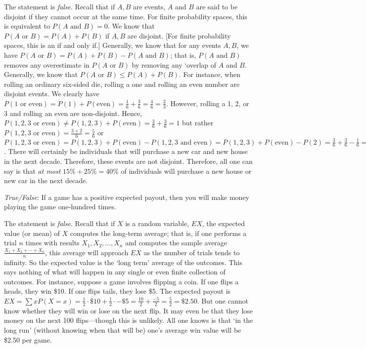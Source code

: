 \documentclass[11pt,letterpaper]{article}
\begin{document}
\sol The statement is \textit{false}. Recall that if $A, B$ are events, $A$ and $B$ are said to be disjoint if they cannot occur at the same time. For finite probability spaces, this is equivalent to $P(A \text{ and } B)= 0$. We know that $P(A \text{ or } B)= P(A) + P(B)$ if $A, B$ are disjoint. [For finite probability spaces, this is an if and only if.] Generally, we know that for any events $A, B$, we have $P(A \text{ or } B)= P(A) + P(B) - P(A \text{ and } B)$; that is, $P(A \text{ and } B)$ removes any overestimate in $P(A \text{ or } B)$ by removing any `overlap of $A$ and $B$. Generally, we know that $P(A \text{ or } B) \leq P(A) + P(B)$. For instance, when rolling an ordinary six-sided die, rolling a one and rolling an even number are disjoint events. We clearly have $P(1 \text{ or even})= P(1) + P(\text{even})= \frac{1}{6} + \frac{3}{6}= \frac{4}{6}= \frac{2}{3}$. However, rolling a 1, 2, or 3 and rolling an even are non-disjoint. Hence, $P(1, 2, 3 \text{ or even}) \neq P(1, 2, 3) + P(\text{even})= \frac{3}{6} + \frac{3}{6}= 1$ but rather $P(1, 2, 3 \text{ or even})= \frac{3 + 2}{6}= \frac{5}{6}$ or $P(1, 2, 3 \text{ or even})= P(1, 2, 3) + P(\text{even}) - P(1, 2, 3 \text{ and even})= P(1, 2, 3) + P(\text{even}) - P(2)= \frac{3}{6} + \frac{3}{6} - \frac{1}{6}= \frac{5}{6}$. There will certainly be individuals that will purchase a new car and new house in the next decade. Therefore, these events are not disjoint. Therefore, all one can say is that \textit{at most} $15\% + 25\%= 40\%$ of individuals will purchase a new house or new car in the next decade. \pvspace{1.3cm}



\quizsol \textit{True/False}: If a game has a positive expected payout, then you will make money playing the game one-hundred times. \pspace

\sol The statement is \textit{false}. Recall that if $X$ is a random variable, $EX$, the expected value (or mean) of $X$ computes the long-term average; that is, if one performs a trial $n$ times with results $X_1, X_2, \ldots, X_n$ and computes the sample average $\frac{X_1 + X_2 + \cdots + X_n}{n}$, this average will approach $EX$ as the number of trials tends to infinity. So the expected value is the `long term' average of the outcomes. This says nothing of what will happen in any single or even finite collection of outcomes. For instance, suppose a game involves flipping a coin. If one flips a heads, they win \$10. If one flips tails, they lose \$5. The expected payout is $EX= \sum x P(X= x)= \frac{1}{2} \cdot \$10 + \frac{1}{2} \cdot -\$5= \frac{10}{2} + \frac{-5}{2}= \frac{5}{2}= \$2.50$. But one cannot know whether they will win or lose on the next flip. It may even be that they lose money on the next 100 flips---though this is unlikely. All one knows is that `in the long run' (without knowing when that will be) one's average win value will be \$2.50 per game. \pvspace{1.3cm}
\end{document}
